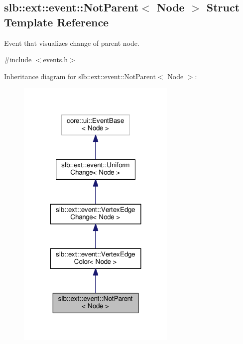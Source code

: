 \hypertarget{structslb_1_1ext_1_1event_1_1NotParent}{}\subsection{slb\+:\+:ext\+:\+:event\+:\+:Not\+Parent$<$ Node $>$ Struct Template Reference}
\label{structslb_1_1ext_1_1event_1_1NotParent}


Event that visualizes change of parent node.  




{\ttfamily \#include $<$events.\+h$>$}



Inheritance diagram for slb\+:\+:ext\+:\+:event\+:\+:Not\+Parent$<$ Node $>$\+:\nopagebreak
\begin{figure}[H]
\begin{center}
\leavevmode
\includegraphics[width=216pt]{structslb_1_1ext_1_1event_1_1NotParent__inherit__graph}
\end{center}
\end{figure}


